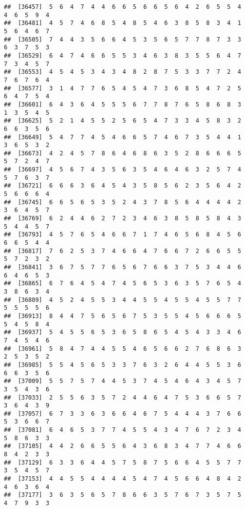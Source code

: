 \documentclass[
]{book}
\begin{document}
\begin{verbatim}
##  [36457]  5  6  4  7  4  4  6  6  5  6  6  5  6  4  2  6  5  5  4  4  6  5  9  4
##  [36481]  4  5  7  4  6  8  5  4  8  5  4  6  3  8  5  8  3  4  1  5  6  4  6  7
##  [36505]  7  4  4  3  5  6  6  4  5  3  5  6  5  7  7  8  7  3  3  6  3  7  5  3
##  [36529]  6  4  7  4  6  6  5  5  3  4  6  3  8  3  5  5  6  4  7  7  3  4  5  7
##  [36553]  4  5  4  5  3  4  3  4  8  2  8  7  5  3  3  7  7  2  4  7  6  7  6  4
##  [36577]  3  1  4  7  7  6  5  4  5  4  7  3  6  8  5  4  7  2  5  6  4  7  5  4
##  [36601]  6  4  3  6  4  5  5  5  6  7  7  8  7  6  5  8  6  8  3  1  3  5  4  5
##  [36625]  5  2  1  4  5  5  2  5  6  5  4  7  3  3  4  5  8  3  2  6  6  3  5  6
##  [36649]  5  4  7  7  4  5  4  6  6  5  7  4  6  7  3  5  4  4  1  3  6  5  3  2
##  [36673]  4  2  4  5  7  8  6  4  6  8  6  3  5  2  8  6  6  6  5  5  7  2  4  7
##  [36697]  4  5  6  7  4  3  5  6  3  5  4  6  4  6  3  2  5  7  4  5  7  6  3  7
##  [36721]  6  6  6  3  6  4  5  4  3  5  8  5  6  2  3  5  6  4  2  5  6  6  6  4
##  [36745]  6  6  5  6  5  3  5  2  4  3  7  8  5  6  4  4  4  4  2  3  6  4  5  7
##  [36769]  6  2  4  4  6  2  7  2  3  4  6  3  8  5  8  5  8  4  3  5  4  4  5  7
##  [36793]  4  5  7  6  5  4  6  6  7  1  7  4  6  5  6  8  4  5  6  6  6  5  4  4
##  [36817]  7  6  2  5  3  7  4  6  6  4  7  6  6  7  2  6  6  5  5  5  7  2  3  2
##  [36841]  3  6  7  5  7  7  6  5  6  7  6  6  3  7  5  3  4  4  6  6  4  6  5  3
##  [36865]  6  7  6  4  5  4  7  4  5  6  5  3  6  3  5  7  6  5  4  3  8  6  3  4
##  [36889]  4  5  2  4  5  5  3  4  4  5  5  4  5  5  4  5  5  7  7  5  5  5  5  6
##  [36913]  8  4  4  7  5  6  5  6  7  5  3  5  5  4  5  6  6  6  5  5  4  5  8  4
##  [36937]  5  4  5  5  6  5  3  6  5  8  6  5  4  5  4  3  3  4  6  7  4  5  4  6
##  [36961]  5  8  4  7  4  4  5  5  4  6  5  6  6  2  7  6  8  6  3  2  5  3  5  2
##  [36985]  5  5  4  5  6  5  3  3  7  6  3  2  6  4  4  5  5  3  6  6  6  3  5  6
##  [37009]  5  5  7  5  7  4  4  5  3  7  4  5  4  6  4  3  4  5  7  3  5  4  3  6
##  [37033]  2  5  5  6  3  5  7  2  4  4  6  4  7  5  3  6  6  5  7  3  6  4  3  9
##  [37057]  6  7  3  3  6  3  6  6  4  6  7  5  4  4  4  3  7  6  6  5  3  6  6  7
##  [37081]  6  4  6  5  3  7  7  4  5  5  4  3  4  7  6  7  2  3  4  5  8  6  3  3
##  [37105]  4  4  2  6  6  5  5  6  4  3  6  8  3  4  7  7  4  6  6  8  4  2  3  3
##  [37129]  6  3  3  6  4  4  5  7  5  8  7  5  6  6  4  5  5  7  7  3  5  4  5  7
##  [37153]  4  4  5  5  4  4  4  4  5  4  7  4  5  6  6  4  8  4  2  4  6  3  6  4
##  [37177]  3  6  3  5  6  5  7  8  6  6  3  5  7  6  7  3  5  7  5  4  7  9  3  3

\end{verbatim}
\end{document}
